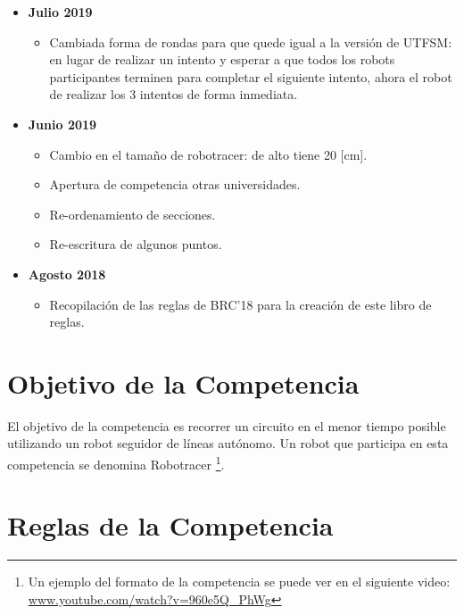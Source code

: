 \begin{itemize}
  \item \textbf{Julio 2019}
  \begin{itemize}
    \item Cambiada forma de rondas para que quede igual a la versión de UTFSM: en lugar de realizar un intento y esperar a que todos los robots participantes terminen para completar el siguiente intento, ahora el robot de realizar los 3 intentos de forma inmediata.
  \end{itemize}
  \item \textbf{Junio 2019}
  \begin{itemize}
    \item Cambio en el tamaño de robotracer: de alto tiene 20 [cm].
    \item Apertura de competencia otras universidades.
    \item Re-ordenamiento de secciones.
    \item Re-escritura de algunos puntos.
  \end{itemize}
  \item \textbf{Agosto 2018}
  \begin{itemize}
    \item Recopilación de las reglas de BRC'18 para la creación de este libro de reglas.
  \end{itemize}
\end{itemize}

\pagebreak

\section{Objetivo de la Competencia}

El objetivo de la competencia es recorrer un circuito en el menor tiempo posible utilizando un robot seguidor de líneas autónomo. Un robot que participa en esta competencia se denomina Robotracer \footnote{Un ejemplo del formato de la competencia se puede ver en el siguiente video: \href{https://www.youtube.com/watch?v=960e5Q_PhWg}{www.youtube.com/watch?v=960e5Q\_PhWg}}.

\section{Reglas de la Competencia}

